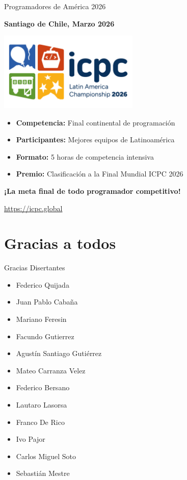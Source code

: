 \documentclass{beamer}
\begin{document}
\begin{frame}{Programadores de América 2026}
\begin{center}

\vspace{0.2cm}

\normalsize
\textbf{Santiago de Chile, Marzo 2026}

\vspace{0.2cm}

\includegraphics[width=0.5\textwidth,keepaspectratio]{img/pda_chile.png}

\vspace{0.3cm}

\begin{itemize}
\item \textbf{Competencia:} Final continental de programación
\item \textbf{Participantes:} Mejores equipos de Latinoamérica
\item \textbf{Formato:} 5 horas de competencia intensiva
\item \textbf{Premio:} Clasificación a la Final Mundial ICPC 2026
\end{itemize}

\vspace{0.2cm}

\textbf{¡La meta final de todo programador competitivo!}

\small
\url{https://icpc.global}
\end{center}
\end{frame}


\section{Gracias a todos}

\begin{frame}{Gracias Disertantes}
    \begin{itemize}
        \item Federico Quijada
        \item Juan Pablo Cabaña
        \item Mariano Feresin
        \item Facundo Gutierrez
        \item Agustín Santiago Gutiérrez
        \item Mateo Carranza Velez
        \item Federico Bersano
        \item Lautaro Lasorsa
        \item Franco De Rico
        \item Ivo Pajor
        \item Carlos Miguel Soto
        \item Sebastián Mestre
    \end{itemize}
\end{frame}
\end{document}

